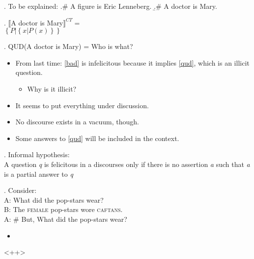 \documentclass[a4paper]{article}
\begin{document}
\ex.\label{bad} To be explained:
\a.\# A figure is Eric Lenneberg.
\b.\# A doctor is Mary.

\ex.\label{ct} $\llbracket$A doctor is Mary$\rrbracket^{CT}=$\\
$\left\{ P | \left\{ x | P(x) \right\}  \right\}$

\ex.\label{qud} QUD(A doctor is Mary) = Who is what?

\begin{itemize}
	\item From last time: \ref{bad} is infelicitous because it implies \ref{qud}, which is an illicit question.
		\begin{itemize}
			\item Why is it illicit?
		\end{itemize}
	\item It seems to put everything under discussion.
	\item No discourse exists in a vacuum, though.
	\item Some answers to \ref{qud} will be included in the context.
\end{itemize}
\ex. Informal hypothesis:\\
A question \textit{q} is felicitous in a discourses only if there is no assertion \textit{a} such that \textit{a} is a partial answer to \textit{q}

\ex. Consider:\\
A: What did the pop-stars wear?\\
B: The \textsc{female} pop-stars wore \textsc{caftans}.\\
A: \# But, What did the pop-stars wear?

\begin{itemize}
	\item 
\end{itemize}<++>
\end{document}
